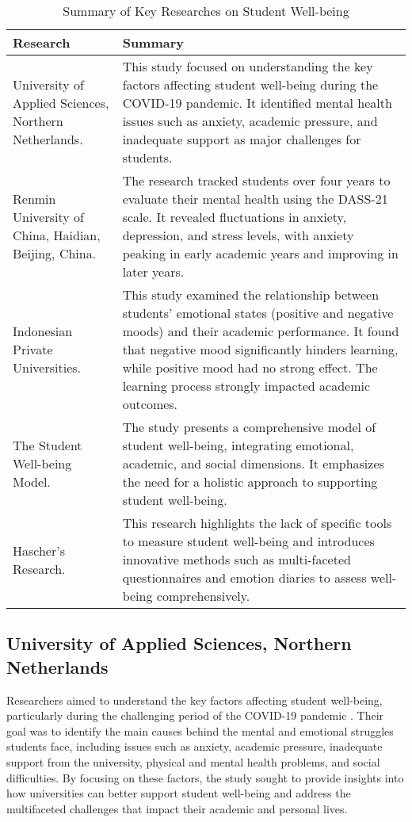 \FloatBarrier
\begin{table}[ht]
\centering
\begin{tabular}{|p{4cm}|p{10cm}|}
\hline
\textbf{Research} & \textbf{Summary} \\ \hline
University of Applied Sciences, Northern Netherlands. & This study focused on understanding the key factors affecting student well-being during the COVID-19 pandemic. It identified mental health issues such as anxiety, academic pressure, and inadequate support as major challenges for students. \\ \hline
Renmin University of China, Haidian, Beijing, China. & The research tracked students over four years to evaluate their mental health using the DASS-21 scale. It revealed fluctuations in anxiety, depression, and stress levels, with anxiety peaking in early academic years and improving in later years. \\ \hline
Indonesian Private Universities. & This study examined the relationship between students' emotional states (positive and negative moods) and their academic performance. It found that negative mood significantly hinders learning, while positive mood had no strong effect. The learning process strongly impacted academic outcomes. \\ \hline
The Student Well-being Model. & The study presents a comprehensive model of student well-being, integrating emotional, academic, and social dimensions. It emphasizes the need for a holistic approach to supporting student well-being. \\ \hline
Hascher's Research. & This research highlights the lack of specific tools to measure student well-being and introduces innovative methods such as multi-faceted questionnaires and emotion diaries to assess well-being comprehensively. \\ \hline
\end{tabular}
\caption{Summary of Key Researches on Student Well-being}
\label{tab:research_summary}
\end{table}
\vspace{5mm}
\FloatBarrier

\subsection{University of Applied Sciences, Northern Netherlands}

Researchers aimed to understand the key factors affecting student well-being, particularly during the challenging period of the COVID-19 pandemic \cite{research-1}. Their goal was to identify the main causes behind the mental and emotional struggles students face, including issues such as anxiety, academic pressure, inadequate support from the university, physical and mental health problems, and social difficulties. By focusing on these factors, the study sought to provide insights into how universities can better support student well-being and address the multifaceted challenges that impact their academic and personal lives.

